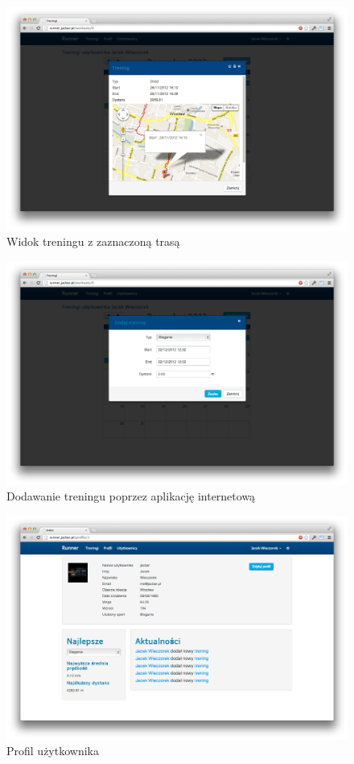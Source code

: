 \begin{figure}[ht]
	\centering
		\includegraphics[width=1\linewidth]{assets/workout_map.png}
	\caption{Widok treningu z zaznaczoną trasą}
	\label{fig:workout_map}
\end{figure}

\begin{figure}[ht]
	\centering
		\includegraphics[width=1\linewidth]{assets/add_workout2.png}
	\caption{Dodawanie treningu poprzez aplikację internetową}
	\label{fig:add_workout}
\end{figure}

\begin{figure}[ht]
	\centering
		\includegraphics[width=1\linewidth]{assets/profil.png}
	\caption{Profil użytkownika}
	\label{fig:add_workout}
\end{figure}

